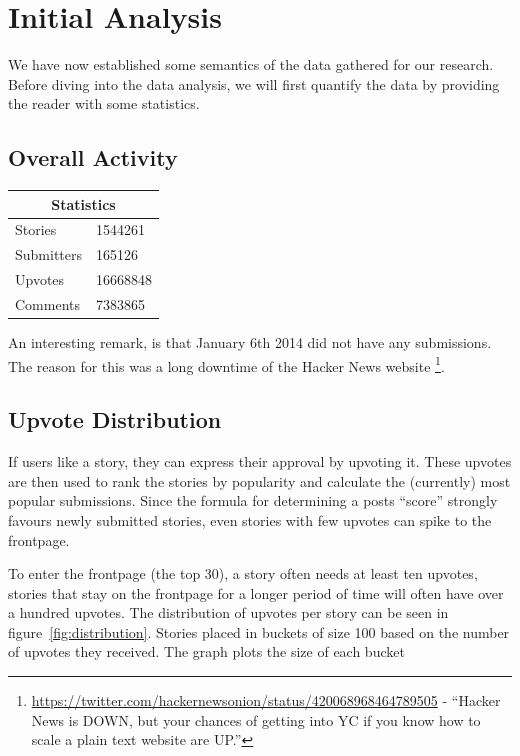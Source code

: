 \section{Initial Analysis}
We have now established some semantics of the data gathered for our research. Before diving into the data analysis, we will first quantify the data by providing the reader with some statistics.

\subsection{Overall Activity}

\begin{center}
    \begin{tabular}{|p{3cm}|p{3cm}|}
        \hline
        \multicolumn{2}{|c|}{Statistics} \\
        \hline
         Stories & 1544261 \\ 
         Submitters & 165126 \\ 
         Upvotes & 16668848 \\ 
         Comments & 7383865 \\
         \hline
    \end{tabular}
\end{center}

An interesting remark, is that January 6th 2014 did not have any submissions. The reason for this was a long downtime of the Hacker News website
\footnote{\url{https://twitter.com/hackernewsonion/status/420068968464789505} - ``Hacker News is DOWN, but your chances of getting into YC if you know how to scale a plain text website are UP.''}.

\subsection{Upvote Distribution}
If users like a story, they can express their approval by upvoting it. These upvotes are then used to rank the stories by popularity and calculate the (currently) most popular submissions. Since the formula for determining a posts ``score'' strongly favours newly submitted stories, even stories with few upvotes can spike to the frontpage.

To enter the frontpage (the top 30), a story often needs at least ten upvotes, stories that stay on the frontpage for a longer period of time will often have over a hundred upvotes. The distribution of upvotes per story can be seen in figure~\ref{fig:distribution}. Stories placed in buckets of size 100 based on the number of upvotes they received. The graph plots the size of each bucket

